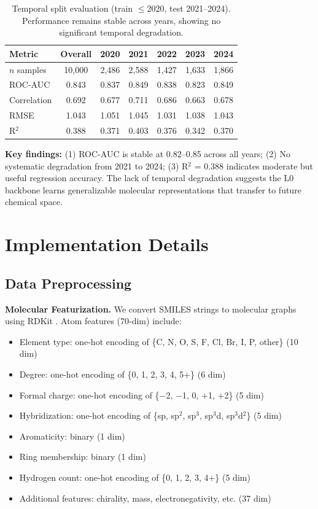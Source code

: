 \documentclass[sigconf,anonymous]{acmart}
\begin{document}
\begin{table}[t]
\caption{Temporal split evaluation (train $\leq$2020, test 2021--2024). Performance remains stable across years, showing no significant temporal degradation.}
\label{tab:temporal}
\centering
\begin{tabular}{@{}lcccccc@{}}
\toprule
Metric & Overall & 2020 & 2021 & 2022 & 2023 & 2024 \\
\midrule
$n$ samples & 10,000 & 2,486 & 2,588 & 1,427 & 1,633 & 1,866 \\
ROC-AUC & 0.843 & 0.837 & 0.849 & 0.838 & 0.823 & 0.849 \\
Correlation & 0.692 & 0.677 & 0.711 & 0.686 & 0.663 & 0.678 \\
RMSE & 1.043 & 1.051 & 1.045 & 1.031 & 1.038 & 1.043 \\
R$^2$ & 0.388 & 0.371 & 0.403 & 0.376 & 0.342 & 0.370 \\
\bottomrule
\end{tabular}
\end{table}

\textbf{Key findings:} (1) ROC-AUC is stable at 0.82--0.85 across all years; (2) No systematic degradation from 2021 to 2024; (3) R$^2$ = 0.388 indicates moderate but useful regression accuracy. The lack of temporal degradation suggests the L0 backbone learns generalizable molecular representations that transfer to future chemical space.

\section{Implementation Details}
\label{app:implementation}

\subsection{Data Preprocessing}

\textbf{Molecular Featurization.} We convert SMILES strings to molecular graphs using RDKit \cite{landrum_rdkit}. Atom features (70-dim) include:
\begin{itemize}[noitemsep]
    \item Element type: one-hot encoding of \{C, N, O, S, F, Cl, Br, I, P, other\} (10 dim)
    \item Degree: one-hot encoding of \{0, 1, 2, 3, 4, 5+\} (6 dim)
    \item Formal charge: one-hot encoding of \{$-$2, $-$1, 0, +1, +2\} (5 dim)
    \item Hybridization: one-hot encoding of \{sp, sp$^2$, sp$^3$, sp$^3$d, sp$^3$d$^2$\} (5 dim)
    \item Aromaticity: binary (1 dim)
    \item Ring membership: binary (1 dim)
    \item Hydrogen count: one-hot encoding of \{0, 1, 2, 3, 4+\} (5 dim)
    \item Additional features: chirality, mass, electronegativity, etc. (37 dim)
\end{itemize}
\end{document}
